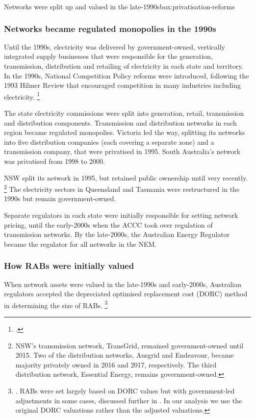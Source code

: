 \documentclass[FrontPage]{grattan}
\begin{document}
\begin{bigbox}{Networks were split up and valued in the late-1990s}{box:privatisation-reforms}

\subsubsection{Networks became regulated monopolies in the 1990s}
Until the 1990s, electricity was delivered by government-owned, vertically integrated supply businesses that were responsible for the generation, transmission, distribution and retailing of electricity in each state and territory. In the 1990s, National Competition Policy reforms were introduced, following the 1993 Hilmer Review that encouraged competition in many industries including electricity.%
\footcite{Hilmer-1993-Review-Natl-Competition}

The state electricity commissions were split into generation, retail, transmission and distribution components. Transmission and distribution networks in each region became regulated monopolies. Victoria led the way, splitting its networks into five distribution companies (each covering a separate zone) and a transmission company, that were privatised in 1995. South Australia's network was privatised from 1998 to 2000. 

NSW split its network in 1995, but retained public ownership until very recently.%
\footnote{NSW's transmission network, TransGrid, remained government-owned until 2015. Two of the distribution networks, Ausgrid and Endeavour, became majority privately owned in 2016 and 2017, respectively. The third distribution network, Essential Energy, remains government-owned.}
The electricity sectors in Queensland and Tasmania were restructured in the 1990s but remain government-owned. 

Separate regulators in each state were initially responsible for setting network pricing, until the early-2000s when the ACCC took over regulation of transmission networks. By the late-2000s, the Australian Energy Regulator became the regulator for all networks in the NEM\@.

\subsubsection{How RABs were initially valued}
When network assets were valued in the late-1990s and early-2000s, Australian regulators accepted the depreciated optimised replacement cost (DORC) method in determining the size of RABs.%
\footnote{\textcite[][68]{AbbottTanKantor2014AssetValuation}. RABs were set largely based on DORC values but with government-led adjustments in some cases, discussed further in . In our analysis we use the original DORC valuations rather than the adjusted valuations.}


\end{bigbox}
\end{document}
